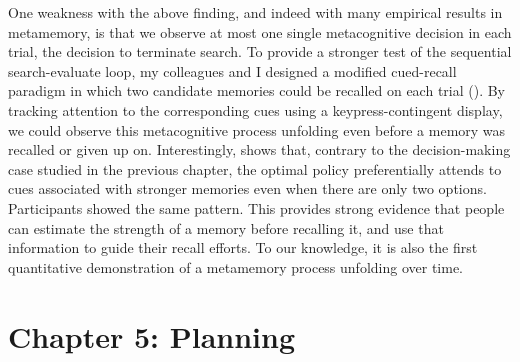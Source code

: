 \documentclass[dsingle]{memo}
\begin{document}
One weakness with the above finding, and indeed with many empirical results in metamemory, is that we observe at most one single metacognitive decision in each trial, the decision to terminate search. To provide a stronger test of the sequential search-evaluate loop, my colleagues and I designed a modified cued-recall paradigm in which two candidate memories could be recalled on each trial (). By tracking attention to the corresponding cues using a keypress-contingent display, we could observe this metacognitive process unfolding even before a memory was recalled or given up on. Interestingly,  shows that, contrary to the decision-making case studied in the previous chapter, the optimal policy preferentially attends to cues associated with stronger memories even when there are only two options. Participants showed the same pattern. This provides strong evidence that people can estimate the strength of a memory before recalling it, and use that information to guide their recall efforts. To our knowledge, it is also the first quantitative demonstration of a metamemory process unfolding over time.


\section{Chapter 5: Planning}
\end{document}
